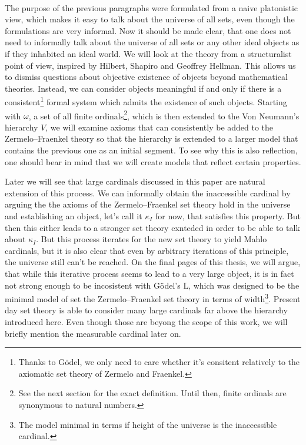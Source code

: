 \documentclass[12pt,a4paper]{article}
\begin{document}
\

The purpose of the previous paragraphs were formulated from a naive platonistic view, which makes it easy to talk about the universe of all sets, even though the formulations are very informal. Now it should be made clear, that one does not need to informally talk about the universe of all sets or any other ideal objects as if they inhabited an ideal world. We will look at the theory from a structuralist point of view, inspired by Hilbert, Shapiro and Geoffrey Hellman. This allows us to dismiss questions about objective existence of objects beyond mathematical theories. Instead, we can consider objects  meaningful if and only if there is a consistent\footnote{Thanks to Gödel, we only need to care whether it's consitent relatively to the axiomatic set theory of Zermelo and Fraenkel.} formal system which admits the existence of such objects. Starting with $\omega$, a set of all finite ordinals\footnote{See the next section for the exact definition. Until then, finite ordinals are synonymous to natural numbers.}, which is then extended to the Von Neumann's hierarchy $V$, we will examine axioms that can consistently be added to the Zermelo–Fraenkel theory so that the hierarchy is extended to a larger model that contains the previous one as an initial segment. To see why this is also reflection, one should bear in mind that we will create models that reflect certain properties.

Later we will see that large cardinals discussed in this paper are natural extension of this process. We can informally obtain the inaccessible cardinal by arguing the the axioms of the Zermelo–Fraenkel set theory hold in the universe and establishing an object, let's call it $\kappa_I$ for now, that satisfies this property. But then this either leads to a stronger set theory exnteded in order to be able to talk about $\kappa_I$. But this process iterates for the new set theory to yield Mahlo cardinals, but it is also clear that even by arbitrary iterations of this principle, the universe still can't be reached. On the final pages of this thesis, we will argue, that while this iterative process seems to lead to a very large object, it is in fact not strong enough to be incosistent with Gödel's L, which was designed to be the minimal model of set the Zermelo–Fraenkel set theory in terms of width\footnote{The model minimal in terms if height of the universe is the inaccessible cardinal.}. Present day set theory is able to consider many large cardinals far above the hierarchy introduced here. Even though those are beyong the scope of this work, we will briefly mention the measurable cardinal later on.
\end{document}
